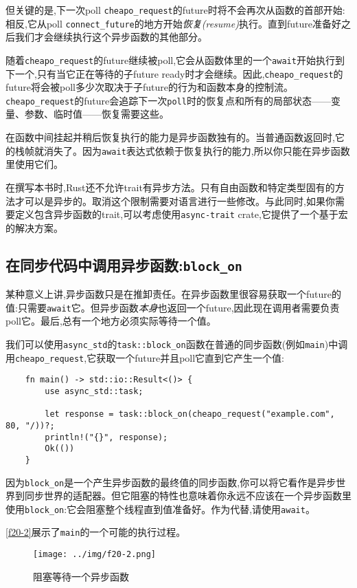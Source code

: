 但关键的是,下一次poll \texttt{cheapo\_request}的future时将不会再次从函数的首部开始:相反,它从poll \texttt{connect\_future}的地方开始\emph{恢复(resume)}执行。直到future准备好之后我们才会继续执行这个异步函数的其他部分。

随着\texttt{cheapo\_request}的future继续被poll,它会从函数体里的一个\texttt{await}开始执行到下一个,只有当它正在等待的子future ready时才会继续。因此,\texttt{cheapo\_request}的future将会被poll多少次取决于子future的行为和函数本身的控制流。\texttt{cheapo\_request}的future会追踪下一次\texttt{poll}时的恢复点和所有的局部状态——变量、参数、临时值——恢复需要这些。

在函数中间挂起并稍后恢复执行的能力是异步函数独有的。当普通函数返回时,它的栈帧就消失了。因为\texttt{await}表达式依赖于恢复执行的能力,所以你只能在异步函数里使用它们。

在撰写本书时,Rust还不允许trait有异步方法。只有自由函数和特定类型固有的方法才可以是异步的。取消这个限制需要对语言进行一些修改。与此同时,如果你需要定义包含异步函数的trait,可以考虑使用\texttt{async-trait} crate,它提供了一个基于宏的解决方案。

\subsection{在同步代码中调用异步函数:\texttt{block\_on}}
某种意义上讲,异步函数只是在推卸责任。在异步函数里很容易获取一个future的值:只需要\texttt{await}它。但异步函数\emph{本身}也返回一个future,因此现在调用者需要负责poll它。最后,总有一个地方必须实际等待一个值。

我们可以使用\texttt{async\_std}的\texttt{task::block\_on}函数在普通的同步函数(例如\texttt{main})中调用\texttt{cheapo\_request},它获取一个future并且poll它直到它产生一个值:
\begin{verbatim}
    fn main() -> std::io::Result<()> {
        use async_std::task;

        let response = task::block_on(cheapo_request("example.com", 80, "/))?;
        println!("{}", response);
        Ok(())
    }
\end{verbatim}

因为\texttt{block\_on}是一个产生异步函数的最终值的同步函数,你可以将它看作是异步世界到同步世界的适配器。但它阻塞的特性也意味着你永远不应该在一个异步函数里使用\texttt{block\_on}:它会阻塞整个线程直到值准备好。作为代替,请使用\texttt{await}。

\autoref{f20-2}展示了\texttt{main}的一个可能的执行过程。

\begin{figure}[htbp]
    \centering
    \texttt{[image: ../img/f20-2.png]}
    \caption{阻塞等待一个异步函数}
    \label{f20-2}
\end{figure}

